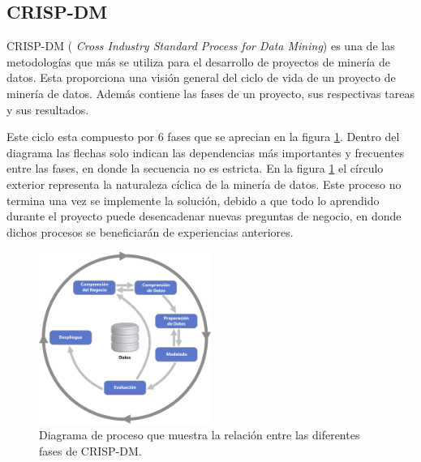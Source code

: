 \subsection{CRISP-DM}

CRISP-DM \cite{Wirth00crisp-dm:towards} (\textit{ Cross Industry Standard Process for Data Mining}) es una de las metodologías que más se utiliza para el desarrollo de proyectos de minería de datos. Esta proporciona una visión general del ciclo de vida de un proyecto de minería de datos. Además contiene las fases de un proyecto, sus respectivas tareas y sus resultados.

Este ciclo esta compuesto por 6 fases que se aprecian en la figura \ref{fig:CRISP-DM_diagrama}. Dentro del diagrama las flechas solo indican las dependencias más importantes y frecuentes entre las fases, en donde la secuencia no es estricta. En la figura \ref{fig:CRISP-DM_diagrama} el círculo exterior representa la naturaleza cíclica de la minería de datos. Este proceso no termina una vez se implemente la solución, debido a que todo lo aprendido durante el proyecto puede desencadenar nuevas preguntas de negocio, en donde dichos procesos se beneficiarán de experiencias anteriores.

\begin{figure}[H]
    \centering
    \includegraphics[width=0.5\textwidth]{images/CRISP-DM_Process_Diagram.jpg}
    \caption{Diagrama de proceso que muestra la relación entre las diferentes fases de CRISP-DM.}
    \label{fig:CRISP-DM_diagrama}
\end{figure}

